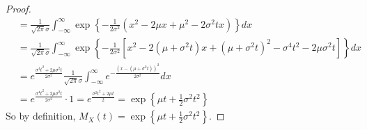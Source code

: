 \documentclass[a4paper, 10pt]{article}
\theoremstyle{definition}
\theoremstyle{hSol}
\begin{document}
\begin{proof}
\begin{equation}
\begin{split}
		&= \frac{1}{\sqrt{2\pi}\sigma} \int_{-\infty}^{\infty} \exp\left\{-\frac{1}{2\sigma^2}(x^2 - 2\mu x + \mu^2 - 2\sigma^2 tx)\right\} dx \\
		&= \frac{1}{\sqrt{2\pi}\sigma} \int_{-\infty}^{\infty} \exp\left\{-\frac{1}{2\sigma^2}[x^2 - 2(\mu + \sigma^2 t)x + (\mu + \sigma^2 t)^2 - \sigma^4 t^2 - 2\mu \sigma^2 t]\right\} dx \\
		&= e^{\frac{\sigma^4 t^2 + 2\mu \sigma^2 t}{2\sigma^2}}\frac{1}{\sqrt{2\pi}\sigma} \int_{-\infty}^{\infty} e^{-\frac{(x- (\mu+\sigma^2t))^2}{2\sigma^2}} dx\\
		&= e^{\frac{\sigma^4 t^2 + 2\mu \sigma^2 t}{2\sigma^2}} \cdot 1 = e^{\frac{\sigma^2 t^2 + 2\mu t}{2}} = \exp\left\{\mu t + \frac{1}{2}\sigma^2 t^2\right\}
	\end{split}
\end{equation}
So by definition, $M_X(t) = \exp\left\{\mu t + \frac{1}{2}\sigma^2 t^2\right\}$.
\end{proof}
\end{document}
